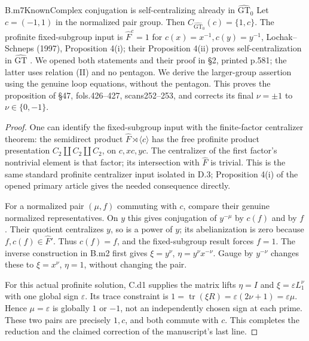 \begin{claim}{B.m7}{Known}{Complex conjugation is self-centralizing already in $\widehat{\mathrm{GT}}_0$}
Let $c=(-1,1)$ in the normalized pair group. Then
$C_{\widehat{\mathrm{GT}}_0}(c)=\{1,c\}$.
The profinite fixed-subgroup input is
$\widehat F^{c}=1$ for $c(x)=x^{-1},c(y)=y^{-1}$, Lochak--Schneps (1997), Proposition 4(i); their Proposition 4(ii) proves self-centralization in $\widehat{\mathrm{GT}}$ \citep{LochakSchneps1997dictionary}. We opened both statements and their proof in \S2, printed p.581; the latter uses relation (II) and no pentagon. We derive the larger-group assertion using the genuine loop equations, without the pentagon. This proves the proposition of \S47, fols.426--427, scans252--253, and corrects its final $\nu=\pm1$ to $\nu\in\{0,-1\}$.
\end{claim}
\begin{proof}
One can identify the fixed-subgroup input with the finite-factor centralizer theorem: the semidirect product $\widehat F\rtimes\langle c\rangle$ has the free profinite product presentation $C_2\amalg C_2\amalg C_2$, on $c,xc,yc$. The centralizer of the first factor's nontrivial element is that factor; its intersection with $\widehat F$ is trivial. This is the same standard profinite centralizer input isolated in D.3; Proposition 4(i) of the opened primary article gives the needed consequence directly.

For a normalized pair $(\mu,f)$ commuting with $c$, compare their genuine normalized representatives. On $y$ this gives conjugation of $y^{-\mu}$ by $c(f)$ and by $f$. Their quotient centralizes $y$, so is a power of $y$; its abelianization is zero because $f,c(f)\in\widehat F'$. Thus $c(f)=f$, and the fixed-subgroup result forces $f=1$. The inverse construction in B.m2 first gives $\xi=y^\nu$, $\eta=y^\nu x^{-\nu}$. Gauge by $y^{-\nu}$ changes these to $\xi=x^\nu$, $\eta=1$, without changing the pair.

For this actual profinite solution, C.d1 supplies the matrix lifts $\eta=I$ and $\xi=\varepsilon L_1^\nu$ with one global sign $\varepsilon$. Its trace constraint is
$1=\operatorname{tr}(\xi R)=\varepsilon(2\nu+1)=\varepsilon\mu$.
Hence $\mu=\varepsilon$ is globally $1$ or $-1$, not an independently chosen sign at each prime. These two pairs are precisely $1,c$, and both commute with $c$. This completes the reduction and the claimed correction of the manuscript's last line.
\end{proof}

